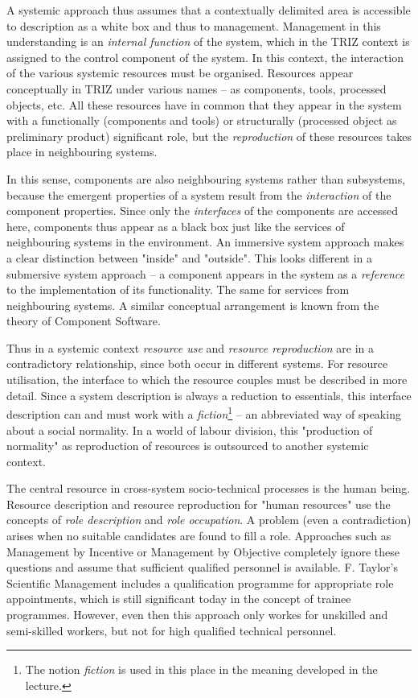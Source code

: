 \documentclass[11pt,a4paper]{article}
\begin{document}
A systemic approach thus assumes that a contextually delimited area is
accessible to description as a white box and thus to management. Management in
this understanding is an \emph{internal function} of the system, which in the
TRIZ context is assigned to the control component of the system. In this
context, the interaction of the various systemic resources must be organised.
Resources appear conceptually in TRIZ under various names -- as components,
tools, processed objects, etc. All these resources have in common that they
appear in the system with a functionally (components and tools) or
structurally (processed object as preliminary product) significant role, but
the \emph{reproduction} of these resources takes place in neighbouring
systems.

In this sense, components are also neighbouring systems rather than
subsystems, because the emergent properties of a system result from the
\emph{interaction} of the component properties. Since only the
\emph{interfaces} of the components are accessed here, components thus appear
as a black box just like the services of neighbouring systems in the
environment.  An immersive system approach makes a clear distinction between
"inside" and "outside". This looks different in a submersive system approach
-- a component appears in the system as a \emph{reference} to the
implementation of its functionality.  The same for services from neighbouring
systems.  A similar conceptual arrangement is known from the theory of
Component Software.

Thus in a systemic context \emph{resource use} and \emph{resource
  reproduction} are in a contradictory relationship, since both occur in
different systems. For resource utilisation, the interface to which the
resource couples must be described in more detail. Since a system description
is always a reduction to essentials, this interface description can and must
work with a \emph{fiction}\footnote{The notion \emph{fiction} is used in this
  place in the meaning developed in the lecture.} -- an abbreviated way of
speaking about a social normality. In a world of labour division, this
"production of normality" as reproduction of resources is outsourced to
another systemic context.

The central resource in cross-system socio-technical processes is the human
being. Resource description and resource reproduction for "human resources"
use the concepts of \emph{role description} and \emph{role occupation}. A
problem (even a contradiction) arises when no suitable candidates are found
to fill a role.  Approaches such as Management by Incentive or Management by
Objective completely ignore these questions and assume that sufficient
qualified personnel is available. F. Taylor's Scientific Management includes
a qualification programme for appropriate role appointments, which is still
significant today in the concept of trainee programmes. However, even then
this approach only workes for unskilled and semi-skilled workers, but not for
high qualified technical personnel.
\end{document}
